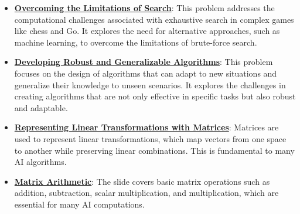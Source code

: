 \documentclass{article}%
\begin{document}
\begin{itemize}[leftmargin=*]%
\item \href{https://purdue.brightspace.com/d2l/common/assets/pdfjs-d2l-dist/1.0.14-legacy/web/viewer.html?file=\%2Fcontent\%2Fenforced\%2F1095467-wl.202510.CS.24300.001\%2F02L2-Intro.pdf\%3Fou\%3D1095467\&lang=en-us\&container=d2l-fileviewer-rendered-pdf\&fullscreen=d2l-fileviewer-rendered-pdf-dialog\&height=667#page=11}{\textbf{Overcoming the Limitations of Search}}: This problem addresses the computational challenges associated with exhaustive search in complex games like chess and Go. It explores the need for alternative approaches, such as machine learning, to overcome the limitations of brute{-}force search.%
\item \href{https://purdue.brightspace.com/d2l/common/assets/pdfjs-d2l-dist/1.0.14-legacy/web/viewer.html?file=\%2Fcontent\%2Fenforced\%2F1095467-wl.202510.CS.24300.001\%2F02L2-Intro.pdf\%3Fou\%3D1095467\&lang=en-us\&container=d2l-fileviewer-rendered-pdf\&fullscreen=d2l-fileviewer-rendered-pdf-dialog\&height=667#page=36}{\textbf{Developing Robust and Generalizable Algorithms}}: This problem focuses on the design of algorithms that can adapt to new situations and generalize their knowledge to unseen scenarios. It explores the challenges in creating algorithms that are not only effective in specific tasks but also robust and adaptable.%
\item \href{https://purdue.brightspace.com/d2l/common/assets/pdfjs-d2l-dist/1.0.14-legacy/web/viewer.html?file=\%2Fcontent\%2Fenforced\%2F1095467-wl.202510.CS.24300.001\%2F04L1-Linear Algebra Primer.pdf\%3Fou\%3D1095467\&lang=en-us\&container=d2l-fileviewer-rendered-pdf\&fullscreen=d2l-fileviewer-rendered-pdf-dialog\&height=667#page=5}{\textbf{Representing Linear Transformations with Matrices}}: Matrices are used to represent linear transformations, which map vectors from one space to another while preserving linear combinations. This is fundamental to many AI algorithms.%
\item \href{https://purdue.brightspace.com/d2l/common/assets/pdfjs-d2l-dist/1.0.14-legacy/web/viewer.html?file=\%2Fcontent\%2Fenforced\%2F1095467-wl.202510.CS.24300.001\%2F04L1-Linear Algebra Primer.pdf\%3Fou\%3D1095467\&lang=en-us\&container=d2l-fileviewer-rendered-pdf\&fullscreen=d2l-fileviewer-rendered-pdf-dialog\&height=667#page=9}{\textbf{Matrix Arithmetic}}: The slide covers basic matrix operations such as addition, subtraction, scalar multiplication, and multiplication, which are essential for many AI computations.%

\end{itemize}
\end{document}
